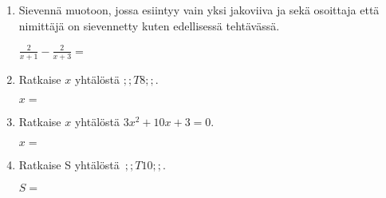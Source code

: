 \documentclass[finnish, a4paper, 12pt]{article}
\begin{document}
\begin{enumerate}[leftmargin=*]
		\vspace{8pt}
		
		\item %
		Sievennä %
		muotoon, jossa esiintyy vain yksi jakoviiva ja sekä osoittaja
		että nimittäjä on sievennetty kuten edellisessä tehtävässä.
		
		\(
		\displaystyle
		\frac{2}{x+1}- \frac{2}{x + 3} =
		\) %
		
		\vspace{8pt}
		
		\item %
		Ratkaise \(x\) yhtälöstä \(;;T8;;\).
		
		\(
		x = 
		\)	%
		
		\vspace{8pt}
		
		\item %
		Ratkaise \(x\) yhtälöstä \(3 x^2  + 10 x + 3= 0\).
		
		\(
		x = 		
		\)	%
		
		\vspace{8pt}
		
		\item %
		Ratkaise S yhtälöstä 
		\(
		\displaystyle \,
		;;T10;; .
		\)	
		
		\(
		S = 
		\) %
		
	\end{enumerate}
	
	
\end{document}
